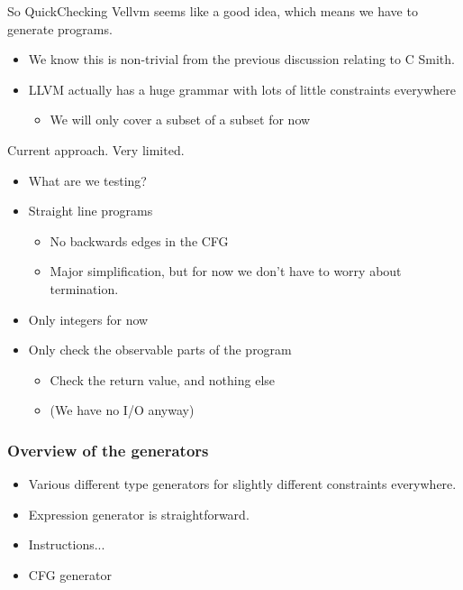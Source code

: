 \documentclass{beamer}
\begin{document}
\begin{frame}
  So QuickChecking Vellvm seems like a good idea, which means we have
  to generate programs.

  \begin{itemize}
  \item We know this is non-trivial from the previous discussion
    relating to C Smith.
  \item LLVM actually has a huge grammar with lots of little
    constraints everywhere
    \begin{itemize}
    \item We will only cover a subset of a subset for now
    \end{itemize}
  \end{itemize}
\end{frame}

\begin{frame}
  Current approach. Very limited.

  \begin{itemize}
  \item What are we testing?
  \item Straight line programs
    \begin{itemize}
    \item No backwards edges in the CFG
    \item Major simplification, but for now we don't have to worry
      about termination.
    \end{itemize}
  \item Only integers for now
  \item Only check the observable parts of the program
    \begin{itemize}
    \item Check the return value, and nothing else
    \item (We have no I/O anyway)
    \end{itemize}
  \end{itemize}
\end{frame}

\begin{frame}
  \frametitle{Overview of the generators}

  \begin{itemize}
  \item Various different type generators for slightly different
    constraints everywhere.
  \item Expression generator is straightforward.
  \item Instructions...
  \item CFG generator
  \end{itemize}

\end{frame}
\end{document}
